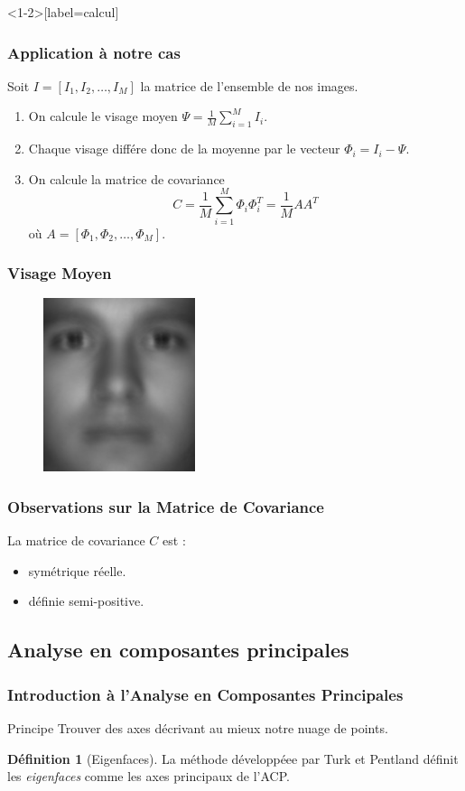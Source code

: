 \documentclass{beamer}
\theoremstyle{plain}
\theoremstyle{definition}
\newtheorem{defi}{Définition}
\begin{document}
\begin{frame}<1-2>[label=calcul]
  \frametitle{Application à notre cas}
  Soit $I = [I_1,I_2,\dotsc,I_M]$ la matrice de l'ensemble de nos images.
  \begin{enumerate}
  \item<2-> On calcule le visage moyen $\Psi = \frac{1}{M}\displaystyle\sum_{i=1}^{M} I_i$.        
  \item<3-> Chaque visage différe donc de la moyenne par le vecteur $\Phi_i = I_i - \Psi$.
  \item<4-> On calcule la matrice de covariance
    \[
      C = \frac{1}{M} \displaystyle\sum_{i=1}^{M} \Phi_i \Phi_i^T = \frac{1}{M} AA^T 
    \]
    où $A = [\Phi_1,\Phi_2,\dotsc,\Phi_M]$.
  \end{enumerate}
\end{frame}

\begin{frame}
  \frametitle{Visage Moyen}
  \begin{figure}
    \includegraphics{src/beamer/figures/mean.jpg}
  \end{figure}
\end{frame}





\begin{frame}
  \frametitle{Observations sur la Matrice de Covariance}
  La matrice de covariance $C$ est :
  \begin{itemize}
  \item<2-> symétrique réelle.
  \item<3-> définie semi-positive.
  \end{itemize}
\end{frame}



\subsection{Analyse en composantes principales}
\begin{frame}
  \frametitle{Introduction à l'Analyse en Composantes Principales}
  \begin{block}{Principe}
    Trouver des axes décrivant au mieux notre nuage de points.
  \end{block}
  \pause
  \begin{defi}[Eigenfaces]
    La méthode développéee par Turk et Pentland définit les \emph{eigenfaces} comme les axes principaux de l'ACP.
  \end{defi}
\end{frame}
\end{document}
